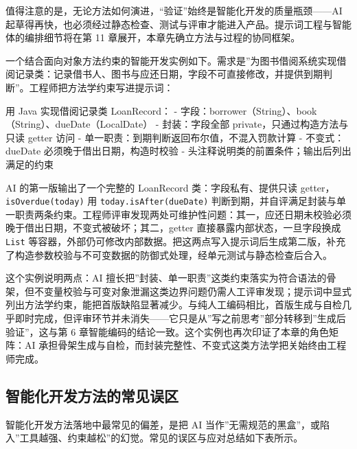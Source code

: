 \documentclass[
]{ctexbook}
\newenvironment{Shaded}{
  \ttfamily\small
}{}
\newcommand{\NormalTok}[1]{#1}
\begin{document}
值得注意的是，无论方法如何演进，``验证''始终是智能化开发的质量瓶颈------AI
起草得再快，也必须经过静态检查、测试与评审才能进入产品。提示词工程与智能体的编排细节将在第
11 章展开，本章先确立方法与过程的协同框架。

一个结合面向对象方法约束的智能开发实例如下。需求是''为图书借阅系统实现借阅记录类：记录借书人、图书与应还日期，字段不可直接修改，并提供到期判断''。工程师把方法学约束写进提示词：

\begin{Shaded}
\begin{Highlighting}[]
\NormalTok{用 Java 实现借阅记录类 LoanRecord：}
\NormalTok{{-} 字段：borrower（String）、book（String）、dueDate（LocalDate）}
\NormalTok{{-} 封装：字段全部 private，只通过构造方法与只读 getter 访问}
\NormalTok{{-} 单一职责：到期判断返回布尔值，不混入罚款计算}
\NormalTok{{-} 不变式：dueDate 必须晚于借出日期，构造时校验}
\NormalTok{{-} 头注释说明类的前置条件；输出后列出满足的约束}
\end{Highlighting}
\end{Shaded}

AI 的第一版输出了一个完整的 LoanRecord 类：字段私有、提供只读
getter，\texttt{isOverdue(today)} 用 \texttt{today.isAfter(dueDate)}
判断到期，并自评满足封装与单一职责两条约束。工程师评审发现两处可维护性问题：其一，应还日期未校验必须晚于借出日期，不变式被破坏；其二，getter
直接暴露内部状态，一旦字段换成 \texttt{List}
等容器，外部仍可修改内部数据。把这两点写入提示词后生成第二版，补充了构造参数校验与不可变数据的防御式处理，经单元测试与静态检查后合入。

这个实例说明两点：AI
擅长把''封装、单一职责''这类约束落实为符合语法的骨架，但不变量校验与可变对象泄漏这类边界问题仍需人工评审发现；提示词中显式列出方法学约束，能把首版缺陷显著减少。与纯人工编码相比，首版生成与自检几乎即时完成，但评审环节并未消失------它只是从''写之前思考''部分转移到''生成后验证''，这与第
6 章智能编码的结论一致。这个实例也再次印证了本章的角色矩阵：AI
承担骨架生成与自检，而封装完整性、不变式这类方法学把关始终由工程师完成。

\subsection{智能化开发方法的常见误区}\label{ux667aux80fdux5316ux5f00ux53d1ux65b9ux6cd5ux7684ux5e38ux89c1ux8befux533a}

智能化开发方法落地中最常见的偏差，是把 AI
当作''无需规范的黑盒''，或陷入''工具越强、约束越松''的幻觉。常见的误区与应对总结如下表所示。
\end{document}

